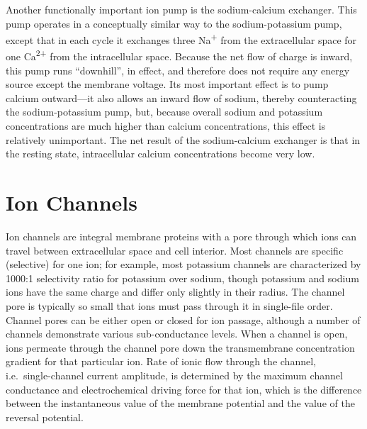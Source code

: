 Another functionally important ion pump is the sodium-calcium exchanger. This pump operates in a conceptually similar way to the sodium-potassium pump, except that in each cycle it exchanges three Na\textsuperscript{+} from the extracellular space for one Ca\textsuperscript{2+} from the intracellular space. Because the net flow of charge is inward, this pump runs ``downhill'', in effect, and therefore does not require any energy source except the membrane voltage. Its most important effect is to pump calcium outward---it also allows an inward flow of sodium, thereby counteracting the sodium-potassium pump, but, because overall sodium and potassium concentrations are much higher than calcium concentrations, this effect is relatively unimportant. The net result of the sodium-calcium exchanger is that in the resting state, intracellular calcium concentrations become very low.

\hypertarget{ion-channels}{%
\section{Ion Channels}\label{ion-channels}}

Ion channels are integral membrane proteins with a pore through which ions can travel between extracellular space and cell interior. Most channels are specific (selective) for one ion; for example, most potassium channels are characterized by 1000:1 selectivity ratio for potassium over sodium, though potassium and sodium ions have the same charge and differ only slightly in their radius. The channel pore is typically so small that ions must pass through it in single-file order. Channel pores can be either open or closed for ion passage, although a number of channels demonstrate various sub-conductance levels. When a channel is open, ions permeate through the channel pore down the transmembrane concentration gradient for that particular ion. Rate of ionic flow through the channel, i.e.~single-channel current amplitude, is determined by the maximum channel conductance and electrochemical driving force for that ion, which is the difference between the instantaneous value of the membrane potential and the value of the reversal potential.

